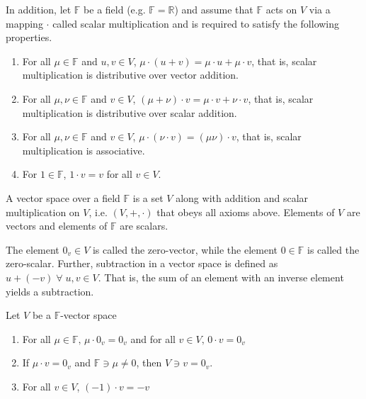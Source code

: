 		\noindent In addition, let $\mathbb{F}$ be a field (e.g. $\mathbb{F} = \mathbb{R}$) and assume that $\mathbb{F}$ acts on $V$ via a mapping $\cdot$ called scalar multiplication and is required to satisfy the following properties.
		
		\begin{enumerate}[label=($M_\arabic*$), leftmargin=3em]
			\item \label{ax:M1} For all $\mu \in \mathbb{F}$ and $u, v \in V$, $\mu \cdot (u + v) = \mu \cdot u + \mu \cdot v$, that is, scalar multiplication is distributive over vector addition.
			\item \label{ax:M2} For all $\mu, \nu \in \mathbb{F}$ and $v \in V$, $(\mu + \nu) \cdot v = \mu \cdot v + \nu \cdot v$, that is, scalar multiplication is distributive over scalar addition.
			\item \label{ax:M3} For all $\mu, \nu \in \mathbb{F}$ and $v \in V$, $\mu \cdot (\nu \cdot v) = (\mu\nu) \cdot v$, that is, scalar multiplication is associative.
			\item \label{ax:M4} For $1 \in \mathbb{F}$, $1 \cdot v = v$ for all $v \in V$.
		\end{enumerate}
		
		\begin{definition}
			A vector space over a field $\mathbb{F}$ is a set $V$ along with addition and scalar multiplication on $V$, i.e. $\left(V, +, \cdot \right)$ that obeys all axioms above. Elements of $V$ are vectors and elements of $\mathbb{F}$ are scalars.
		\end{definition}
		
		\noindent The element $0_v \in V$ is called the zero-vector, while the element $0 \in \mathbb{F}$ is called the zero-scalar. Further, subtraction in a vector space is defined as $u + (- v) \; \forall \; u, v \in V$. That is, the sum of an element with an inverse element yields a subtraction.
		
		\begin{proposition}
			\label{prop:vspace-properties}
			Let $V$ be a $\mathbb{F}$-vector space
			
			\begin{enumerate}[label=\roman*.]
				\item For all $\mu \in \mathbb{F}, \, \mu \cdot 0_v = 0_v$ and for all $v \in V, \, 0 \cdot v = 0_v$
				\item If $\mu \cdot v = 0_v$ and $\mathbb{F} \ni \mu \not= 0$, then $V \ni v = 0_v$.
				\item For all $v \in V$, $(-1) \cdot v = -v$
			\end{enumerate}
			
		\end{proposition}
		
